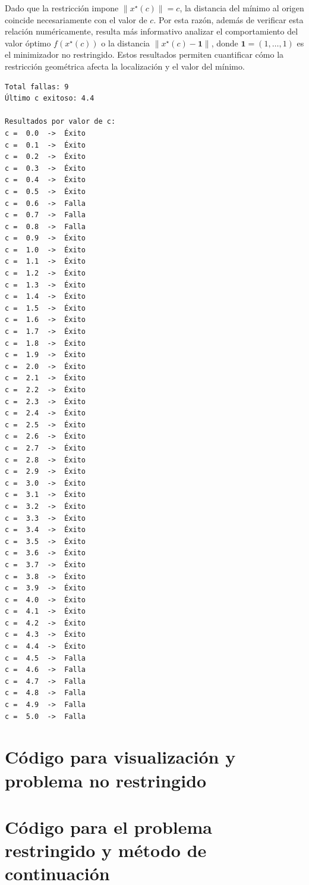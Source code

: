 \documentclass[11pt,a4paper]{article}
\begin{document}
Dado que la restricción impone \(\|x^\star(c)\|=c\), la distancia del mínimo al origen coincide necesariamente con el valor de \(c\). Por esta razón, además de verificar esta relación numéricamente, resulta más informativo analizar el comportamiento del valor óptimo \(f(x^\star(c))\) o la distancia \(\|x^\star(c)-\mathbf{1}\|\), donde \(\mathbf{1}=(1,\dots,1)\) es el minimizador no restringido. Estos resultados permiten cuantificar cómo la restricción geométrica afecta la localización y el valor del mínimo.
\begin{verbatim}
Total fallas: 9
Último c exitoso: 4.4

Resultados por valor de c:
c =  0.0  ->  Éxito
c =  0.1  ->  Éxito
c =  0.2  ->  Éxito
c =  0.3  ->  Éxito
c =  0.4  ->  Éxito
c =  0.5  ->  Éxito
c =  0.6  ->  Falla
c =  0.7  ->  Falla
c =  0.8  ->  Falla
c =  0.9  ->  Éxito
c =  1.0  ->  Éxito
c =  1.1  ->  Éxito
c =  1.2  ->  Éxito
c =  1.3  ->  Éxito
c =  1.4  ->  Éxito
c =  1.5  ->  Éxito
c =  1.6  ->  Éxito
c =  1.7  ->  Éxito
c =  1.8  ->  Éxito
c =  1.9  ->  Éxito
c =  2.0  ->  Éxito
c =  2.1  ->  Éxito
c =  2.2  ->  Éxito
c =  2.3  ->  Éxito
c =  2.4  ->  Éxito
c =  2.5  ->  Éxito
c =  2.6  ->  Éxito
c =  2.7  ->  Éxito
c =  2.8  ->  Éxito
c =  2.9  ->  Éxito
c =  3.0  ->  Éxito
c =  3.1  ->  Éxito
c =  3.2  ->  Éxito
c =  3.3  ->  Éxito
c =  3.4  ->  Éxito
c =  3.5  ->  Éxito
c =  3.6  ->  Éxito
c =  3.7  ->  Éxito
c =  3.8  ->  Éxito
c =  3.9  ->  Éxito
c =  4.0  ->  Éxito
c =  4.1  ->  Éxito
c =  4.2  ->  Éxito
c =  4.3  ->  Éxito
c =  4.4  ->  Éxito
c =  4.5  ->  Falla
c =  4.6  ->  Falla
c =  4.7  ->  Falla
c =  4.8  ->  Falla
c =  4.9  ->  Falla
c =  5.0  ->  Falla
\end{verbatim}

\appendix

\section{Código para visualización y problema no restringido}
\label{ap:codigo1}


\section{Código para el problema restringido y método de continuación}
\label{ap:codigo2}


\end{document}
